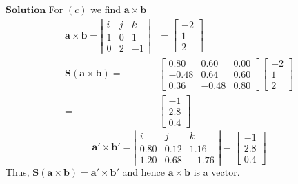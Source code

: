 $\boxed{\textbf{Solution}}$ For $(c)$ we find $\mathbf{a} \times \mathbf{b}$
$$
\begin{aligned}
\mathbf{a} \times \mathbf{b}=\left|\begin{array}{ccc}
i & j & k \\
1 & 0 & 1 \\
0 & 2 & -1
\end{array}\right| &=\begin{bmatrix}
-2 \\
1 \\
2
\end{bmatrix} \\
\mathbf{S}(\mathbf{a} \times \mathbf{b})=&\begin{bmatrix}
0.80 & 0.60 & 0.00 \\
-0.48 & 0.64 & 0.60 \\
0.36 & -0.48 & 0.80
\end{bmatrix}\begin{bmatrix}
-2 \\
1 \\
2
\end{bmatrix} \\
=&\begin{bmatrix}
-1 \\
2.8 \\
0.4
\end{bmatrix}
\end{aligned}
$$
$$
\mathbf{a}' \times \mathbf{b}'=\left|\begin{array}{ccc}
i & j & k \\
0.80 & 0.12 & 1.16 \\
1.20 & 0.68 & -1.76
\end{array}\right|=\begin{bmatrix}
-1 \\
2.8 \\
0.4
\end{bmatrix}
$$
Thus, $\mathbf{S}(\mathbf{a} \times \mathbf{b})=\mathbf{a}' \times \mathbf{b}'$ and hence $\mathbf{a} \times \mathbf{b}$ is a vector.




\newpage


